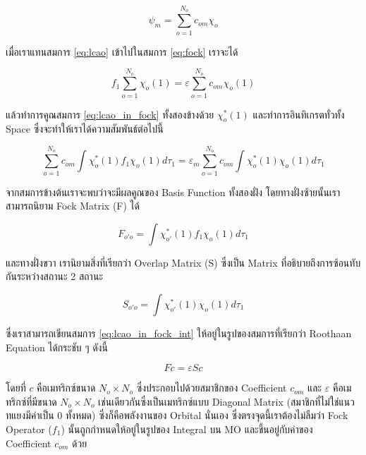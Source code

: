 \begin{equation}\label{eq:lcao}
    \psi_{m} = \sum^{N_{o}}_{o=1} c_{om} \chi_{o} 
\end{equation}

\noindent เมื่อเราแทนสมการ \ref{eq:lcao} เข้าไปในสมการ \ref{eq:fock} เราจะได้

\begin{equation}\label{eq:lcao_in_fock}
    f_{1} \sum^{N_{o}}_{o=1} \chi_{o}(1) = \varepsilon \sum^{N_{o}}_{o=1} c_{om} \chi_{o}(1)
\end{equation}

\noindent แล้วทำการคูณสมการ \ref{eq:lcao_in_fock} ทั้งสองข้างด้วย $\chi^{*}_{o}(1)$ และทำการอินทิเกรตทั่วทั้ง Space 
ซึ่งจะทำให้เราได้ความสัมพันธ์ต่อไปนี้

\begin{equation}\label{eq:lcao_in_fock_int}
    \sum^{N_{o}}_{o=1} c_{om} \int \chi^{*}_{o}(1) f_{1} \chi_{o}(1) d\tau_{1} =
    \varepsilon_{m} \sum^{N_{o}}_{o=1} c_{om} \int \chi^{*}_{o}(1) \chi_{o}(1) d\tau_{1}
\end{equation}

\noindent จากสมการข้างต้นเราจะพบว่าจะมีผลคูณของ Basis Function ทั้งสองฝั่ง โดยทางฝั่งซ้ายนั้นเราสามารถนิยาม Fock Matrix (F) ได้

\begin{equation}\label{eq:matrix_fock}
    F_{o'o} = \int \chi^{*}_{o'}(1) f_{1} \chi_{o}(1) d\tau_{1}
\end{equation}

\noindent และทางฝั่งขวา เรานิยามสิ่งที่เรียกว่า Overlap Matrix (S) ซึ่งเป็น Matrix ที่อธิบายถึงการซ้อนทับกันระหว่างสถานะ 2 สถานะ

\begin{equation}\label{eq:matrix_overlap}
    S_{o'o} = \int \chi^{*}_{o'}(1) \chi_{o}(1) d\tau_{1}
\end{equation}

\noindent ซึ่งเราสามารถเขียนสมการ \ref{eq:lcao_in_fock_int} ให้อยู่ในรูปของสมการที่เรียกว่า Roothaan Equation ได้กระชับ ๆ ดังนี้

\begin{equation}\label{eq:roothaan}
    F c = \varepsilon S c
\end{equation}

\noindent โดยที่ $c$ คือเมทริกซ์ขนาด $N_{o} \times N_{o}$ ซึ่งประกอบไปด้วยสมาชิกของ Coefficient $c_{om}$ และ $\varepsilon$ 
คือเมทริกซ์ที่มีขนาด $N_{o} \times N_{o}$ เช่นเดียวกันซึ่งเป็นเมทริกซ์แบบ Diagonal Matrix (สมาชิกที่ไม่ใช่แนวทแยงมีค่าเป็น 0 ทั้งหมด) 
ซึ่งก็คือพลังงานของ Orbital นั่นเอง ซึ่งตรงจุดนี้เราต้องไม่ลืมว่า Fock Operator ($f_{1}$) นั้นถูกกำหนดให้อยู่ในรูปของ Integral บน MO 
และขึ้นอยู่กับค่าของ Coefficient $c_{om}$ ด้วย

